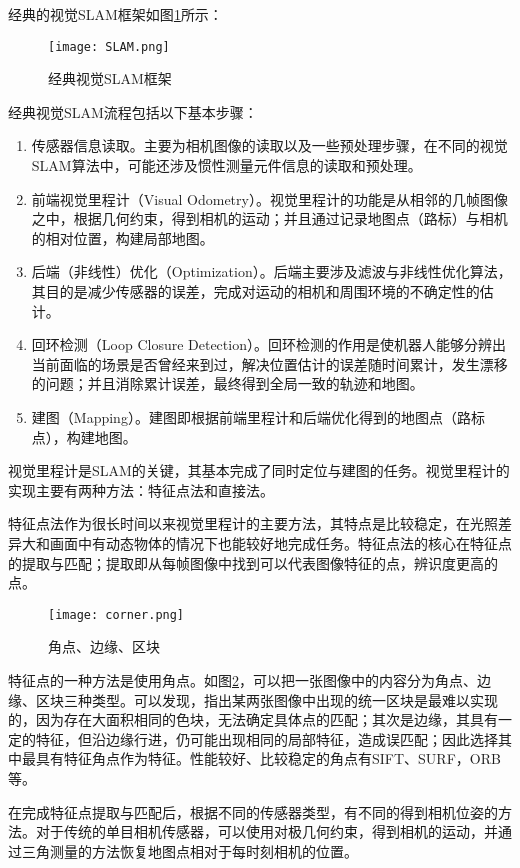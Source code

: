 经典的视觉SLAM框架如图\ref{fig5}所示：

\begin{figure}[!ht]
	\centering
	\texttt{[image: SLAM.png]}
	\caption{经典视觉SLAM框架} 
	\label{fig5}
\end{figure}

经典视觉SLAM流程包括以下基本步骤：
\begin{enumerate}
	\item 
	传感器信息读取。主要为相机图像的读取以及一些预处理步骤，在不同的视觉SLAM算法中，可能还涉及惯性测量元件信息的读取和预处理。
	\item 
	前端视觉里程计（Visual Odometry）。视觉里程计的功能是从相邻的几帧图像之中，根据几何约束，得到相机的运动；并且通过记录地图点（路标）与相机的相对位置，构建局部地图。
	\item 
	后端（非线性）优化（Optimization）。后端主要涉及滤波与非线性优化算法，其目的是减少传感器的误差，完成对运动的相机和周围环境的不确定性的估计。
	\item 
	回环检测（Loop Closure Detection）。回环检测的作用是使机器人能够分辨出当前面临的场景是否曾经来到过，解决位置估计的误差随时间累计，发生漂移的问题；并且消除累计误差，最终得到全局一致的轨迹和地图。
	\item 
	建图（Mapping）。建图即根据前端里程计和后端优化得到的地图点（路标点），构建地图。
\end{enumerate}

视觉里程计是SLAM的关键，其基本完成了同时定位与建图的任务。视觉里程计的实现主要有两种方法：特征点法和直接法。

特征点法作为很长时间以来视觉里程计的主要方法，其特点是比较稳定，在光照差异大和画面中有动态物体的情况下也能较好地完成任务。特征点法的核心在特征点的提取与匹配；提取即从每帧图像中找到可以代表图像特征的点，辨识度更高的点。

\begin{figure}[!ht]
	\centering
	\texttt{[image: corner.png]}
	\caption{角点、边缘、区块} 
	\label{fig6}
\end{figure}

特征点的一种方法是使用角点。如图\ref{fig6}，可以把一张图像中的内容分为角点、边缘、区块三种类型。可以发现，指出某两张图像中出现的统一区块是最难以实现的，因为存在大面积相同的色块，无法确定具体点的匹配；其次是边缘，其具有一定的特征，但沿边缘行进，仍可能出现相同的局部特征，造成误匹配；因此选择其中最具有特征角点作为特征。性能较好、比较稳定的角点有SIFT、SURF，ORB等。

在完成特征点提取与匹配后，根据不同的传感器类型，有不同的得到相机位姿的方法。对于传统的单目相机传感器，可以使用对极几何约束，得到相机的运动，并通过三角测量的方法恢复地图点相对于每时刻相机的位置。

